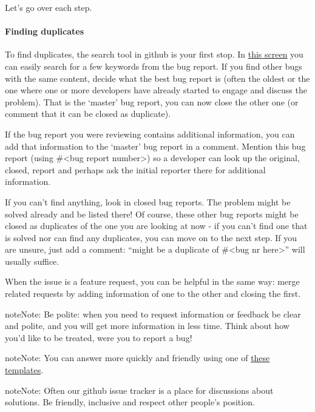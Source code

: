 \documentclass[letterpaper,10pt,english]{sphinxmanual}
\begin{document}
Let's go over each step.


\paragraph{Finding duplicates}
\label{bugtracker/triaging:finding-duplicates}
To find duplicates, the search tool in github is your first stop. In \href{https://github.com/owncloud/core/issues}{this screen} you can easily search for a few keywords from the bug report. If you find other bugs with the same content, decide what the best bug report is (often the oldest or the one where one or more developers have already started to engage and discuss the problem). That is the `master' bug report, you can now close the other one (or comment that it can be closed as duplicate).

If the bug report you were reviewing contains additional information, you can add that information to the `master' bug report in a comment. Mention this bug report (using \#\textless{}bug report number\textgreater{}) so a developer can look up the original, closed, report and perhaps ask the initial reporter there for additional information.

If you can't find anything, look in closed bug reports. The problem might be solved already and be listed there! Of course, these other bug reports might be closed as duplicates of the one you are looking at now - if you can't find one that is solved nor can find any duplicates, you can move on to the next step. If you are unsure, just add a comment: ``might be a duplicate of \#\textless{}bug nr here\textgreater{}'' will usually suffice.

When the issue is a feature request, you can be helpful in the same way: merge related requests by adding information of one to the other and closing the first.

\begin{notice}{note}{Note:}
Be polite: when you need to request information or feedback be clear and polite, and you will get more information in less time. Think about how you'd like to be treated, were you to report a bug!
\end{notice}

\begin{notice}{note}{Note:}
You can answer more quickly and friendly using one of \href{https://gist.github.com/jancborchardt/6155185\#clean-up-inactive-issues}{these templates}.
\end{notice}

\begin{notice}{note}{Note:}
Often our github issue tracker is a place for discussions about solutions. Be friendly, inclusive and respect other people's position.
\end{notice}
\end{document}
